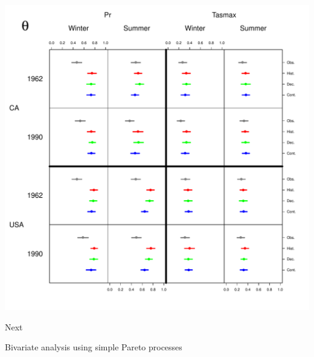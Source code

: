 \documentclass[mathserif, 11pt, t]{beamer}
\begin{document}
\begin{frame}
\begin{center}
\includegraphics[scale=0.34]{figs/theta.pdf}
\end{center}
\end{frame}


\begin{frame}{Next}

Bivariate analysis using simple Pareto processes

\end{frame}
\end{document}

